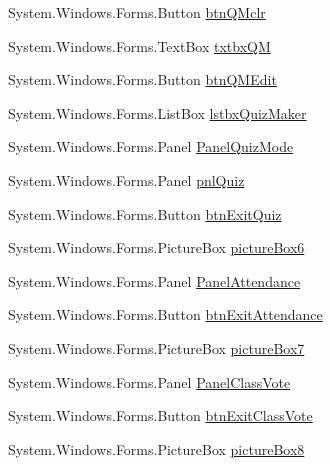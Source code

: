 \begin{DoxyCompactItemize}
\item 
\-System.\-Windows.\-Forms.\-Button \hyperlink{class_sr_p___classroom_inq_1_1frm_classrrom_inq_a07b511c8a2d041cab8551a9b7b9a65de}{btn\-Q\-Mclr}
\item 
\-System.\-Windows.\-Forms.\-Text\-Box \hyperlink{class_sr_p___classroom_inq_1_1frm_classrrom_inq_a4a85095c6aa75b21689e40d7dc78ace6}{txtbx\-Q\-M}
\item 
\-System.\-Windows.\-Forms.\-Button \hyperlink{class_sr_p___classroom_inq_1_1frm_classrrom_inq_ab86f3e7a592038c27499e00ec0a7fb3b}{btn\-Q\-M\-Edit}
\item 
\-System.\-Windows.\-Forms.\-List\-Box \hyperlink{class_sr_p___classroom_inq_1_1frm_classrrom_inq_af2496f0a0579263d9def95bd23d29c89}{lstbx\-Quiz\-Maker}
\item 
\-System.\-Windows.\-Forms.\-Panel \hyperlink{class_sr_p___classroom_inq_1_1frm_classrrom_inq_a0dfa3465bc2680dd54dfeacc88b39bee}{\-Panel\-Quiz\-Mode}
\item 
\-System.\-Windows.\-Forms.\-Panel \hyperlink{class_sr_p___classroom_inq_1_1frm_classrrom_inq_a482ea3246ef232cad6430e85e54a0e3a}{pnl\-Quiz}
\item 
\-System.\-Windows.\-Forms.\-Button \hyperlink{class_sr_p___classroom_inq_1_1frm_classrrom_inq_a207f1be65a3e42071f8375603e4b854c}{btn\-Exit\-Quiz}
\item 
\-System.\-Windows.\-Forms.\-Picture\-Box \hyperlink{class_sr_p___classroom_inq_1_1frm_classrrom_inq_a1431b950ca4cfb27ea99f44116fa80da}{picture\-Box6}
\item 
\-System.\-Windows.\-Forms.\-Panel \hyperlink{class_sr_p___classroom_inq_1_1frm_classrrom_inq_a45178e53b0fdc6749e2557f299ddddac}{\-Panel\-Attendance}
\item 
\-System.\-Windows.\-Forms.\-Button \hyperlink{class_sr_p___classroom_inq_1_1frm_classrrom_inq_a93fffe4de78481ddb21200cf66e89a17}{btn\-Exit\-Attendance}
\item 
\-System.\-Windows.\-Forms.\-Picture\-Box \hyperlink{class_sr_p___classroom_inq_1_1frm_classrrom_inq_a48b90a7203524b9da0e6bcba8ea1ba6e}{picture\-Box7}
\item 
\-System.\-Windows.\-Forms.\-Panel \hyperlink{class_sr_p___classroom_inq_1_1frm_classrrom_inq_a1225290cf0284e727d8a2ce9aa2d2a33}{\-Panel\-Class\-Vote}
\item 
\-System.\-Windows.\-Forms.\-Button \hyperlink{class_sr_p___classroom_inq_1_1frm_classrrom_inq_a86eaeeecc049840138ceb3aa2d9bf9ef}{btn\-Exit\-Class\-Vote}
\item 
\-System.\-Windows.\-Forms.\-Picture\-Box \hyperlink{class_sr_p___classroom_inq_1_1frm_classrrom_inq_a22ca58dbc8343b3531e756221803eb3d}{picture\-Box8}

\end{DoxyCompactItemize}
